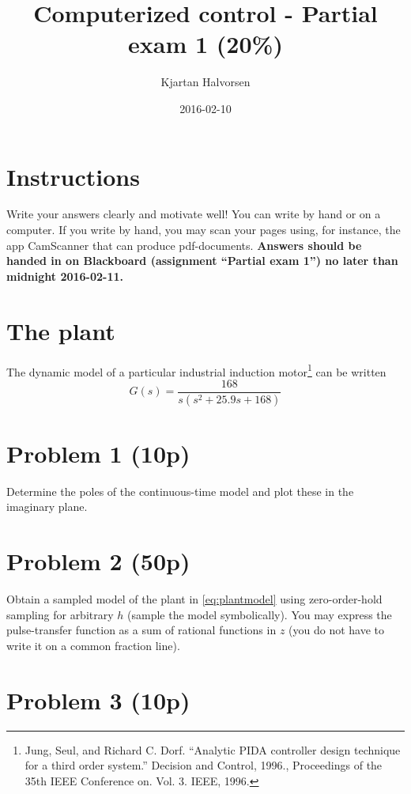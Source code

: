 \documentclass{scrartcl}
\title{Computerized control - Partial exam 1 (20\%)}
\author{Kjartan Halvorsen}
\date{2016-02-10}
\begin{document}
\maketitle



\section*{Instructions}
\label{sec-1}


Write your answers clearly and motivate well! You can write by hand or on a computer. If you write by hand, you may scan your pages using, for instance, the app CamScanner that can produce pdf-documents. \textbf{Answers should be handed in on Blackboard (assignment ``Partial exam 1'') no later than midnight 2016-02-11.}
\section*{The plant}
\label{sec-2}

The dynamic model of a particular industrial induction motor\footnote{Jung, Seul, and Richard C. Dorf. ``Analytic PIDA controller design technique for a third order system.'' Decision and Control, 1996., Proceedings of the 35th IEEE Conference on. Vol. 3. IEEE, 1996.
 } can be written
\begin{equation}
G(s) = \frac{168}{s(s^2 + 25.9s + 168)}
\label{eq:plantmodel}
\end{equation}
\section*{Problem 1 (10p)}
\label{sec-3}

  Determine the poles of the continuous-time model and plot these in the imaginary plane.
\section*{Problem 2 (50p)}
\label{sec-4}

  Obtain a sampled model of the plant in \eqref{eq:plantmodel} using zero-order-hold sampling for arbitrary $h$ (sample the model symbolically). You may express the pulse-transfer function as a sum of rational functions in $z$ (you do not have to write it on a common fraction line). 
  
\section*{Problem 3 (10p)}
\label{sec-5}
\end{document}
